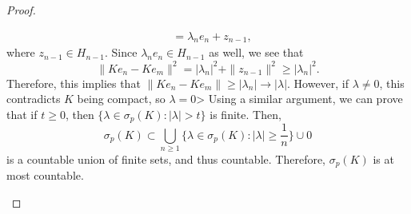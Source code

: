 \documentclass[12pt]{article}
\newcommand{\sbs}{\subset}
\begin{document}
\begin{proof}
\begin{enumerate}
\begin{align*}
& = \lambda_n e_n + z_{n-1},
\end{align*}
where $z_{n - 1} \in H_{n - 1}$. Since $\lambda_n e_n \in H_{n -1}$ as well, we see that 
\[ \| K e_n - K e_m \|^2 = |\lambda_n|^2 + \| z_{n -1}\|^2 \geq |\lambda_n|^2.\]
Therefore, this implies that $\| K e_n - K e_m \| \geq |\lambda_n| \to | \lambda |$. However, if $\lambda \neq 0$, this contradicts $K$ being compact, so $\lambda = 0$> Using a similar argument, we can prove that if $t \geq 0$, then $\{ \lambda \in \sigma_p(K) : |\lambda| > t \}$ is finite. Then,
\[ \sigma_p(K) \sbs \bigcup_{n \geq 1} \{ \lambda \in \sigma_p(K) : |\lambda| \geq \frac{1}{n} \} \cup 0\]
is a countable union of finite sets, and thus countable. Therefore, $\sigma_p(K)$ is at most countable.
\end{enumerate}
\end{proof}
\vspace{-25pt}
\end{document}
